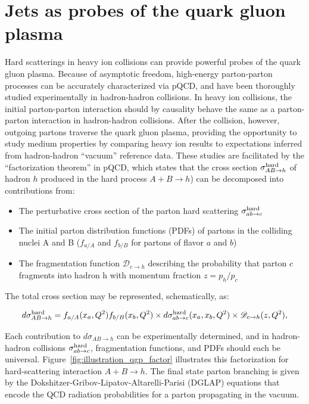 \clearpage

\section{Jets as probes of the quark gluon plasma}
\label{sec:theory_jets}

Hard scatterings in heavy ion collisions can provide powerful probes of the quark gluon plasma.  Because of asymptotic freedom, high-energy parton-parton processes can be accurately characterized via pQCD, and have been thoroughly studied experimentally in hadron-hadron collisions.  In heavy ion collisions, the initial parton-parton interaction should by causality behave the same as a parton-parton interaction in hadron-hadron collisions.  After the collision, however, outgoing partons traverse the quark gluon plasma, providing the opportunity to study medium properties by comparing heavy ion results to expectations inferred from hadron-hadron ``vacuum'' reference data.  These studies are facilitated by the ``factorization theorem'' in pQCD, which states that the cross section $\sigma_{AB\rightarrow h}^{\rm hard}$ of hadron $h$  produced in the hard process $ A + B \rightarrow h$) can be decomposed into contributions from:  

\begin{itemize}
\item The perturbative cross section of the parton hard scattering $\sigma_{ab\rightarrow c}^{\rm hard}$ 
\item The initial parton distribution functions (PDFs) of partons in the colliding nuclei A and B ($f_{a/A}$ and $f_{b/B}$ for partons of flavor $a$ and $b$)
\item The fragmentation function $\mathscr{D}_{c\rightarrow h}$ describing the probability that parton $c$ fragments into hadron h with momentum fraction $z = p_{h}/p_{c}$ 
\end{itemize}

\noindent The total cross section may be represented, schematically, as:  

\begin{equation}
\label{eq:factorization}
d \sigma_{AB\rightarrow h}^{\rm hard} = f_{a/A}(x_{a},Q^{2})  f_{b/B}(x_{b},Q^{2}) \times d \sigma_{ab\rightarrow c}^{\rm hard}(x_{a},x_{b},Q^{2}) \times \mathscr{D}_{c\rightarrow h}(z,Q^{2}),
\end{equation}

\noindent Each contribution to $d \sigma_{AB\rightarrow h}$ can be experimentally determined, and in hadron-hadron collisions $\sigma_{ab\rightarrow c}^{\rm hard}$, fragmentation functions, and PDFs should each be universal.  Figure~\ref{fig:illustration_qgp_factor} illustrates this factorization for hard-scattering interaction $A+B \rightarrow h$.  The final state parton branching is given by the Dokshitzer-Gribov-Lipatov-Altarelli-Parisi (DGLAP) equations that encode the QCD radiation probabilities for a parton propagating in the vacuum.  

